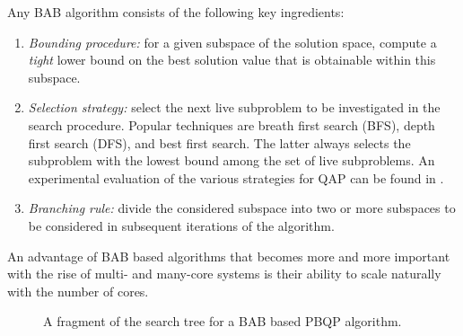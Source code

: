 Any BAB algorithm consists of the following key ingredients:
\begin{enumerate}
\item \emph{Bounding procedure:} for a given subspace of the solution
  space, compute a \emph{tight} lower bound on the best solution value
  that is obtainable within this subspace.
\item \emph{Selection strategy:} select the next live subproblem to be
  investigated in the search procedure. Popular techniques are breath
  first search (BFS), depth first search (DFS), and best first
  search. The latter always selects the subproblem with the lowest
  bound among the set of live subproblems. An experimental evaluation
  of the various strategies for QAP can be found in \cite{ClausenP99}.
\item \emph{Branching rule:} divide the considered subspace into two
  or more subspaces to be considered in subsequent iterations of the
  algorithm.
\end{enumerate}

An advantage of BAB based algorithms that becomes more and more
important with the rise of multi- and many-core systems is their
ability to scale naturally with the number of cores.

\begin{figure}
  \begin{center}
  \end{center}
  \caption{A fragment of the search tree for a BAB based PBQP algorithm.}
  \label{fig:pbqp:bab-tree}
\end{figure}

